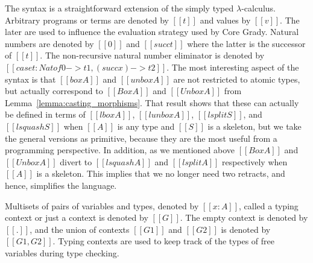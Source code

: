 The syntax is a straightforward extension of the simply typed
$\lambda$-calculus.  Arbitrary programs or terms are denoted by
$[[t]]$ and values by $[[v]]$. The later are used to influence the
evaluation strategy used by Core Grady.  Natural numbers are denoted
by $[[0]]$ and $[[succ t]]$ where the latter is the successor of
$[[t]]$.  The non-recursive natural number eliminator is denoted by
$[[case t : Nat of 0 -> t1, (succ x) -> t2]]$.  The most interesting
aspect of the syntax is that $[[box A]]$ and $[[unbox A]]$ are not
restricted to atomic types, but actually correspond to $[[Box A]]$ and
$[[Unbox A]]$ from Lemma~\ref{lemma:casting_morphisms}.  That result
shows that these can actually be defined in terms of $[[lbox A]]$,
$[[lunbox A]]$, $[[lsplit S]]$, and $[[lsquash S]]$ when $[[A]]$ is
any type and $[[S]]$ is a skeleton, but we take the general versions
as primitive, because they are the most useful from a programming
perspective.  In addition, as we mentioned above $[[Box A]]$ and
$[[Unbox A]]$ divert to $[[lsquash A]]$ and $[[lsplit A]]$
respectively when $[[A]]$ is a skeleton.  This implies that we no
longer need two retracts, and hence, simplifies the language.

Multisets of pairs of variables and types, denoted by $[[x : A]]$,
called a typing context or just a context is denoted by $[[G]]$.  The
empty context is denoted by $[[.]]$, and the union of contexts
$[[G1]]$ and $[[G2]]$ is denoted by $[[G1,G2]]$.  Typing contexts are
used to keep track of the types of free variables during type
checking.

